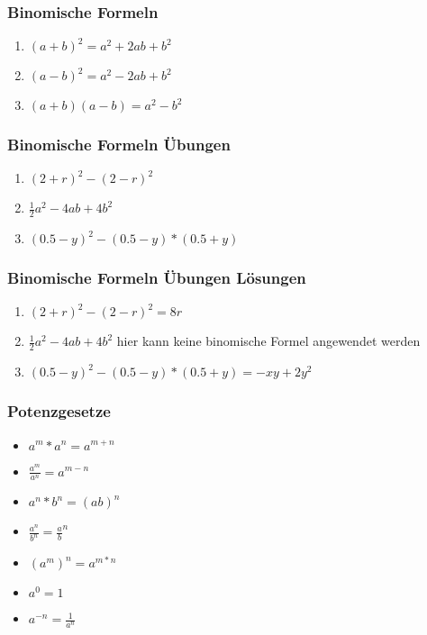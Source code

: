 \begin{frame}
    \frametitle{Binomische Formeln}
    \begin{enumerate}
        \setlength\itemsep{1em}
        \item $(a+b)^2 = a^2 + 2ab + b^2$
        \item $(a-b)^2 = a^2 - 2ab + b^2$
        \item $(a+b)(a-b) = a^2 - b^2$
    \end{enumerate}
\end{frame}

\begin{frame}
    \frametitle{Binomische Formeln Übungen}
    \begin{enumerate}
        \setlength\itemsep{1em}
        \item $(2+r)^2 - (2-r)^2$
        \item $\frac{1}{2}a^2 - 4ab + 4b^2$
        \item $(0.5-y)^2 - (0.5 - y)*(0.5 + y)$
    \end{enumerate}
\end{frame}

\begin{frame}
    \frametitle{Binomische Formeln Übungen Lösungen}
    \begin{enumerate}
        \setlength\itemsep{1em}
        \item $(2+r)^2 - (2-r)^2 = 8r$
        \item $\frac{1}{2}a^2 - 4ab + 4b^2$ hier kann keine binomische Formel angewendet werden
        \item $(0.5-y)^2 - (0.5 - y)*(0.5 + y) = -xy+2y^2$
    \end{enumerate}
\end{frame}


\begin{frame}
    \frametitle{Potenzgesetze}
	\begin{itemize}
		\setlength\itemsep{1em}
		\item $a^m * a^n = a^{m+n}$
		\item $\frac{a^m}{a^n} = a^{m-n}$
		\item $a^n * b^n = (ab)^n$
		\item $\frac{a^n}{b^n} = \frac{a}{b}^n$
		\item $(a^m)^n = a^{m*n}$
		\item $a^0 = 1$
		\item $a^{-n} = \frac{1}{a^n}$
	\end{itemize}
\end{frame}

